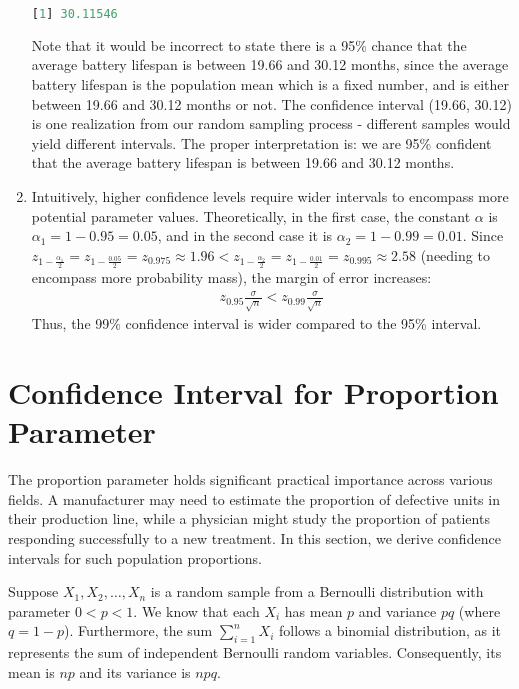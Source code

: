 \begin{solution}
\begin{enumerate}
\begin{lstlisting}[language=R]
[1] 30.11546
    \end{lstlisting}
    Note that it would be incorrect to state there is a 95\% chance that the average battery lifespan is between 19.66 and 30.12 months,
    since the average battery lifespan is the population mean which is a fixed number, and is either between 19.66 and 30.12 months or not.
    The confidence interval (19.66, 30.12) is one realization from our random sampling process - different samples would yield different intervals.
    The proper interpretation is: we are 95\% confident that the average battery lifespan is between 19.66 and 30.12 months.
    \item Intuitively, higher confidence levels require wider intervals to encompass more potential parameter values.
    Theoretically, in the first case, the constant \( \alpha \) is \( \alpha_1 = 1 - 0.95 = 0.05 \), and in the second case it is \( \alpha_2 = 1 - 0.99 = 0.01 \).
    Since \( z_{1 - \frac{\alpha_1}{2}} = z_{1 - \frac{0.05}{2}} = z_{0.975} \approx 1.96 < z_{1 - \frac{\alpha_2}{2}} = z_{1 - \frac{0.01}{2}} = z_{0.995} \approx 2.58 \) (needing to encompass more probability mass), the margin of error increases:
    \begin{gather*}
        z_{0.95}\frac{\sigma}{\sqrt{n}} < z_{0.99}\frac{\sigma}{\sqrt{n}}
    \end{gather*}
    Thus, the 99\% confidence interval is wider compared to the 95\% interval.
    \end{enumerate}
\end{solution}

\section{Confidence Interval for Proportion Parameter}

The proportion parameter holds significant practical importance across various fields.
A manufacturer may need to estimate the proportion of defective units in their production line,
while a physician might study the proportion of patients responding successfully to a new treatment.
In this section, we derive confidence intervals for such population proportions.

Suppose \( X_1, X_2, \ldots, X_n \) is a random sample from a Bernoulli distribution with parameter \( 0 < p < 1 \).
We know that each \( X_i \) has mean \( p \) and variance \( pq \) (where \( q = 1 - p \)).
Furthermore, the sum \( \sum_{i = 1}^{n} X_i \) follows a binomial distribution, as it represents the sum of independent Bernoulli random variables.
Consequently, its mean is \( np \) and its variance is \( npq \).

